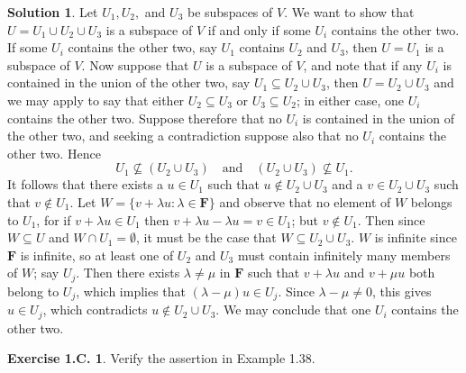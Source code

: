 \documentclass[12pt]{article}
\theoremstyle{definition}
\theoremstyle{exercise}
\newtheorem{exercise}{Exercise 1.C.}
\theoremstyle{solution}
\newtheorem*{solution}{Solution}
\newcommand{\F}{\mathbf{F}}
\begin{document}
\begin{solution}
    Let \( U_1, U_2, \) and \( U_3 \) be subspaces of \( V \). We want to show that \( U = U_1 \cup U_2 \cup U_3 \) is a subspace of \( V \) if and only if some \( U_i \) contains the other two. If some \( U_i \) contains the other two, say \( U_1 \) contains \( U_2 \) and \( U_3 \), then \( U = U_1 \) is a subspace of \( V \). Now suppose that \( U \) is a subspace of \( V \), and note that if any \( U_i \) is contained in the union of the other two, say \( U_1 \subseteq U_2 \cup U_3 \), then \( U = U_2 \cup U_3 \) and we may apply  to say that either \( U_2 \subseteq U_3 \) or \( U_3 \subseteq U_2 \); in either case, one \( U_i \) contains the other two. Suppose therefore that no \( U_i \) is contained in the union of the other two, and seeking a contradiction suppose also that no \( U_i \) contains the other two. Hence
    \[
        U_1 \not\subseteq (U_2 \cup U_3) \quad \text{and} \quad (U_2 \cup U_3) \not\subseteq U_1.
    \]
    It follows that there exists a \( u \in U_1 \) such that \( u \not\in U_2 \cup U_3 \) and a \( v \in U_2 \cup U_3 \) such that \( v \not\in U_1 \). Let \( W = \{ v + \lambda u : \lambda \in \F \} \) and observe that no element of \( W \) belongs to \( U_1 \), for if \( v + \lambda u \in U_1 \) then \( v + \lambda u - \lambda u = v \in U_1 \); but \( v \not\in U_1 \). Then since \( W \subseteq U \) and \( W \cap U_1 = \emptyset \), it must be the case that \( W \subseteq U_2 \cup U_3 \). \( W \) is infinite since \( \F \) is infinite, so at least one of \( U_2 \) and \( U_3 \) must contain infinitely many members of \( W \); say \( U_j \). Then there exists \( \lambda \neq \mu \) in \( \F \) such that \( v + \lambda u \) and \( v + \mu u \) both belong to \( U_j \), which implies that \( (\lambda - \mu) u \in U_j \). Since \( \lambda - \mu \neq 0 \), this gives \( u \in U_j \), which contradicts \( u \not\in U_2 \cup U_3 \). We may conclude that one \( U_i \) contains the other two.
\end{solution}

\begin{exercise}
\label{ex:14}
    Verify the assertion in Example 1.38.
\end{exercise}
\end{document}
